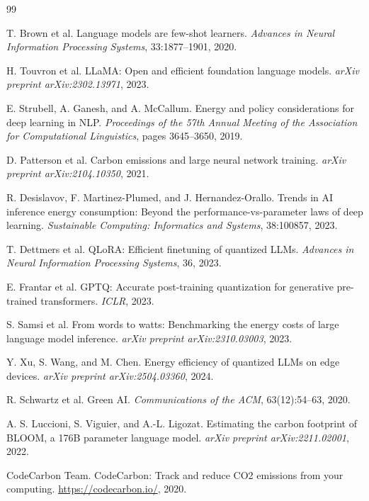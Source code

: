 \documentclass[11pt]{article}
\begin{document}

\begin{thebibliography}{99}

 T. Brown et al. Language models are few-shot learners. \textit{Advances in Neural Information Processing Systems}, 33:1877--1901, 2020.

 H. Touvron et al. LLaMA: Open and efficient foundation language models. \textit{arXiv preprint arXiv:2302.13971}, 2023.

 E. Strubell, A. Ganesh, and A. McCallum. Energy and policy considerations for deep learning in NLP. \textit{Proceedings of the 57th Annual Meeting of the Association for Computational Linguistics}, pages 3645--3650, 2019.

 D. Patterson et al. Carbon emissions and large neural network training. \textit{arXiv preprint arXiv:2104.10350}, 2021.

 R. Desislavov, F. Martinez-Plumed, and J. Hernandez-Orallo. Trends in AI inference energy consumption: Beyond the performance-vs-parameter laws of deep learning. \textit{Sustainable Computing: Informatics and Systems}, 38:100857, 2023.

 T. Dettmers et al. QLoRA: Efficient finetuning of quantized LLMs. \textit{Advances in Neural Information Processing Systems}, 36, 2023.

 E. Frantar et al. GPTQ: Accurate post-training quantization for generative pre-trained transformers. \textit{ICLR}, 2023.

 S. Samsi et al. From words to watts: Benchmarking the energy costs of large language model inference. \textit{arXiv preprint arXiv:2310.03003}, 2023.

 Y. Xu, S. Wang, and M. Chen. Energy efficiency of quantized LLMs on edge devices. \textit{arXiv preprint arXiv:2504.03360}, 2024.

 R. Schwartz et al. Green AI. \textit{Communications of the ACM}, 63(12):54--63, 2020.

 A. S. Luccioni, S. Viguier, and A.-L. Ligozat. Estimating the carbon footprint of BLOOM, a 176B parameter language model. \textit{arXiv preprint arXiv:2211.02001}, 2022.

 CodeCarbon Team. CodeCarbon: Track and reduce CO2 emissions from your computing. \url{https://codecarbon.io/}, 2020.


\end{thebibliography}
\end{document}
